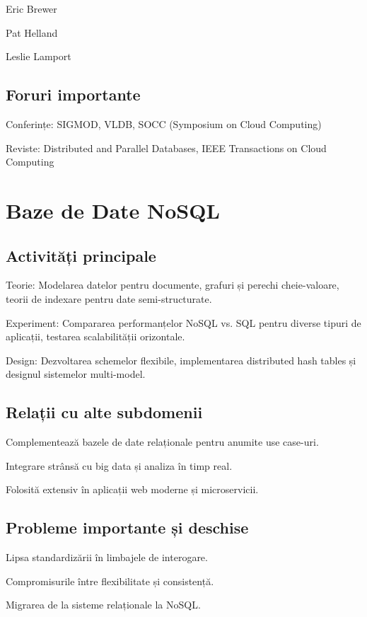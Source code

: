 \documentclass[12pt]{article}
\begin{document}
Eric Brewer

Pat Helland

Leslie Lamport

\subsection*{Foruri importante}

Conferințe: SIGMOD, VLDB, SOCC (Symposium on Cloud Computing)

Reviste: Distributed and Parallel Databases, IEEE Transactions on Cloud Computing

\section{Baze de Date NoSQL}

\subsection*{Activități principale}

Teorie: Modelarea datelor pentru documente, grafuri și perechi cheie-valoare, teorii de indexare pentru date semi-structurate.

Experiment: Compararea performanțelor NoSQL vs. SQL pentru diverse tipuri de aplicații, testarea scalabilității orizontale.

Design: Dezvoltarea schemelor flexibile, implementarea distributed hash tables și designul sistemelor multi-model.

\subsection*{Relații cu alte subdomenii}

Complementează bazele de date relaționale pentru anumite use case-uri.

Integrare strânsă cu big data și analiza în timp real.

Folosită extensiv în aplicații web moderne și microservicii.

\subsection*{Probleme importante și deschise}

Lipsa standardizării în limbajele de interogare.

Compromisurile între flexibilitate și consistență.

Migrarea de la sisteme relaționale la NoSQL.
\end{document}
